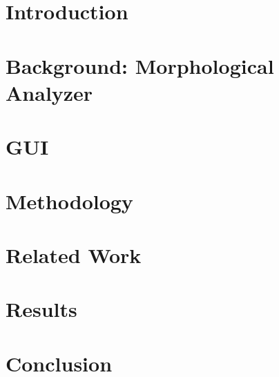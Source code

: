 

\section{Introduction}
\label{sec:introduction}


%

\section{Background: Morphological Analyzer}
\label{sec:morph}


\section{\framework}
\label{sec:framework}


\section{\framework GUI}
\label{sec:gui}


\section{Methodology}
\label{sec:methodology}


\section{Related Work}
\label{sec:related}


\section{Results}
\label{sec:results}


\section{Conclusion}
\label{sec:conclusion}



{\tiny }


